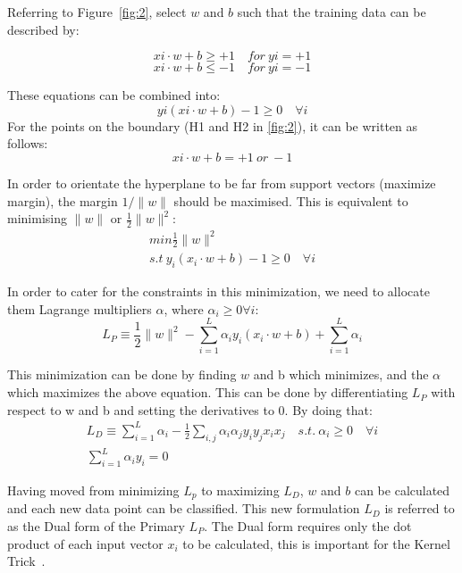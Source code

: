 \documentclass[letterpaper,10pt]{article}
\theoremstyle{mytheor}
\begin{document}
Referring to Figure~\ref{fig:2}, select $w$ and $b$ such that the training data can be described by:

\begin{equation}
xi \cdot w + b \geq  +1 \quad for\ yi = +1
\end{equation}
\begin{equation}
xi \cdot w + b \leq -1 \quad for\ yi = -1
\end{equation}

These equations can be combined into:
\begin{equation}
yi (xi \cdot w + b) - 1 \geq 0 \quad \forall i
\end{equation}
For the points on the boundary (H1 and H2 in \ref{fig:2}), it can be written as follows:
\begin{equation}
xi \cdot w + b = +1\ or\ -1  
\end{equation}

In order to orientate the hyperplane to be far from support vectors (maximize margin), the margin $1/\|w\|$   should be maximised. This is equivalent to minimising $\|w\|$ or $\frac{1}{2}\|w\|^{2}$:
\begin{gather}
min \frac{1}{2} \|w\|^{2} \\ 
s.t\  y_i (x_i \cdot w + b) -1 \geq 0 \quad \forall i
\end{gather}

In order to cater for the constraints in this minimization, we need to allocate them Lagrange multipliers $\alpha$, where $\alpha_{i} \geq 0 \forall i$:
\begin{equation}
L_P \equiv \frac{1}{2} \|w\|^{2} - \sum^{L}_{i=1}  \alpha_{i}y_i (x_i \cdot w + b) + \sum^{L}_{i=1} \alpha_{i}
\end{equation}

This minimization can be done by finding $w$ and b which minimizes, and the $\alpha$ which maximizes the above equation. This can be done by differentiating $L_P$ with respect to  w and b and setting the derivatives to 0. By doing that:
\begin{gather}
L_D \equiv \sum^{L}_{i=1} \alpha_{i} - \frac{1}{2} \sum_{i,j} \alpha_{i}\alpha_{j}y_i y_j x_i x_j \quad s.t.\ \alpha_{i} \geq 0 \quad \forall i \\
\sum^{L}_{i=1}  \alpha_{i}y_i = 0  
\end{gather}

Having moved from minimizing $L_p$ to maximizing $L_D$, $w$ and $b$ can be calculated and each new data point can be classified. This new formulation $L_D$ is referred to as the Dual form of the Primary $L_P$. The Dual form requires only the dot product of each input vector $x_i$ to be calculated, this is important for the Kernel Trick~\cite{fletcher2009support}.
\end{document}
